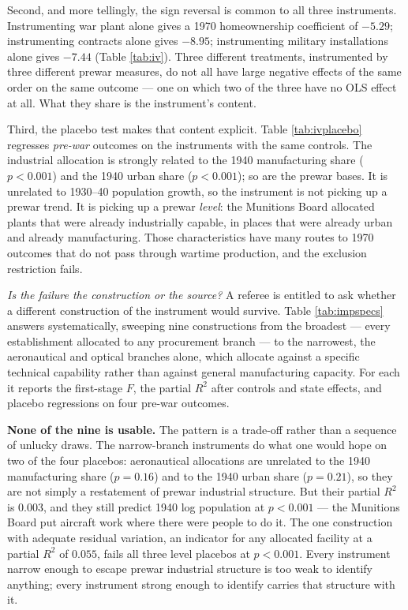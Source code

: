 \documentclass[12pt]{article}
\begin{document}
Second, and more tellingly, the sign reversal is common to all three
instruments. Instrumenting war plant alone gives a 1970 homeownership
coefficient of $-5.29$; instrumenting contracts alone gives $-8.95$;
instrumenting military installations alone gives $-7.44$ (Table
\ref{tab:iv}). Three different treatments, instrumented by three different
prewar measures, do not all have large negative effects of the same order on
the same outcome --- one on which two of the three have no OLS effect at all.
What they share is the instrument's content.

Third, the placebo test makes that content explicit. Table
\ref{tab:ivplacebo} regresses \emph{pre-war} outcomes on the instruments with
the same controls. The industrial allocation is strongly related to the 1940
manufacturing share ($p < 0.001$) and the 1940 urban share ($p < 0.001$); so are
the prewar bases. It is unrelated to 1930--40 population growth, so the
instrument is not picking up a prewar trend. It is picking up a prewar
\emph{level}: the Munitions Board allocated plants that were already
industrially capable, in places that were already urban and already
manufacturing. Those characteristics have many routes to 1970 outcomes that do
not pass through wartime production, and the exclusion restriction fails.

\emph{Is the failure the construction or the source?} A referee is entitled
to ask whether a different construction of the instrument would survive. Table
\ref{tab:impspecs} answers systematically, sweeping nine constructions from the
broadest --- every establishment allocated to any procurement branch --- to the
narrowest, the aeronautical and optical branches alone, which allocate against a
specific technical capability rather than against general manufacturing
capacity. For each it reports the first-stage $F$, the partial $R^2$ after
controls and state effects, and placebo regressions on four pre-war outcomes.

\textbf{None of the nine is usable.} The pattern is a trade-off rather than a
sequence of unlucky draws. The narrow-branch instruments do what one would hope
on two of the four placebos: aeronautical allocations are unrelated to the 1940
manufacturing share ($p = 0.16$) and to the 1940 urban share ($p = 0.21$), so
they are not simply a restatement of prewar industrial structure. But their
partial $R^2$ is $0.003$, and they still predict 1940 log population at
$p < 0.001$ --- the Munitions Board put aircraft work where there were people to
do it. The one construction with adequate residual variation, an indicator for
any allocated facility at a partial $R^2$ of $0.055$, fails all three
level placebos at $p < 0.001$. Every instrument narrow enough to escape prewar
industrial structure is too weak to identify anything; every instrument strong
enough to identify carries that structure with it.
\end{document}
